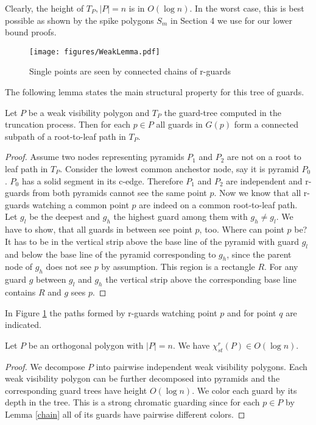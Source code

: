\documentclass[a4paper,USenglish,numberwithinsect]{lipics}
\theoremstyle{plain}
\begin{document}
Clearly, the height of $T_P, |P|=n$ is in $O(\log{n})$. In the worst case, this is best possible as shown by the spike
polygons $S_m$ in Section 4  we use for our lower
bound proofs.


\begin{figure}
\centering
\texttt{[image: figures/WeakLemma.pdf]}
\caption{Single points are seen by connected  chains of r-guards}
\label{guardTree}
\end{figure}


The following lemma states the main structural property for this  tree
of guards.
\begin{lemma}
\label{chain}
Let $P$ be  a weak visibility polygon and $T_P$ the
guard-tree computed in the truncation process. Then for each $p\in P$
all guards in $G(p)$  form  a connected subpath of a  root-to-leaf
path in $T_P$.
\end{lemma}

\begin{proof}
Assume two nodes representing pyramids $P_1$ and $P_2$ are not on a root
to leaf path in $T_P$. Consider the lowest common anchestor node, say it
is pyramid $P_0$. $P_0$ has a solid segment in its c-edge. Therefore
$P_1$ and $P_2$ are independent and r-guards from both pyramids cannot
see the same point $p$. Now we know that all r-guards watching a common
point $p$ are indeed on a common root-to-leaf path. Let $g_l$ be the
deepest and $g_h$ the highest guard among them with $g_h\not= g_l$. We
have to show, that all guards in between see point $p$, too. Where can
point $p$ be? It has to be in the vertical strip above the base line of
the pyramid with guard $g_l$ and below the base line of the pyramid
corresponding to $g_h$, since the parent node of $g_h$ does not see $p$
by assumption. This region is a rectangle $R$. For any guard $g$ between $g_l$
and $g_h$ the vertical strip above the corresponding base line contains
$R$ and $g$ sees $p$.  
\end{proof}
In Figure \ref{guardTree} the paths formed by r-guards watching point $p$ and for point $q$
are indicated.

\begin{theorem}
\label{stTheorem}
Let $P$ be an orthogonal  polygon with $|P|=n$. We have
$\chi^r_{st}(P)\in O(\log{n})$.


\end{theorem}

\begin{proof} We decompose $P$ into pairwise independent weak visibility
polygons. Each weak visibility polygon can be further decomposed into 
pyramids and the corresponding guard trees have height 
$O(\log{n})$. We color each guard by its depth in the tree.
 This is a strong chromatic guarding since for each $p\in
P$ by Lemma \ref{chain} all  of its guards have pairwise different colors.
\end{proof}
\end{document}
